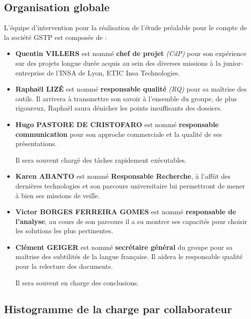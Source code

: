 \documentclass[twoside]{article}
\begin{document}
\subsection{Organisation globale}

L'équipe d'intervention pour la réalisation de l'étude préalable pour le compte
de la société GSTP est composée de : 

\begin{itemize}
\item {\bf Quentin VILLERS} est nommé {\bf chef de projet} {\sl (CdP)} 
pour son expérience sur des projets longue durée acquis au sein des
diverses missions à la junior-entreprise de l'INSA de Lyon, ETIC Insa 
Technologies.
\item {\bf Raphaël LIZÉ} est nommé {\bf responsable qualité} {\sl (RQ)}
pour sa maîtrise des outils. Il arrivera à transmettre son savoir à
l'ensemble du groupe, de plus rigoureux, Raphaël saura dénicher les
points insuffisants des dossiers. 
\item {\bf Hugo PASTORE DE CRISTOFARO} est nommé {\bf responsable communication}
pour son approche commerciale et la qualité de ses présentations. 

Il sera souvent chargé des tâches rapidement exécutables.
\item {\bf Karen ABANTO} est nommé {\bf Responsable Recherche}, à l'affût
des dernières technologies et son parcours universitaire lui permettront
de mener à bien ses missions de veille.
\item {\bf Victor BORGES FERREIRA GOMES} est nommé {\bf responsable de
l'analyse}, au cours de son parcours il a su montrer ses capacités pour
choisir les solutions les plus pertinentes.
\item {\bf Clément GEIGER} est nommé {\bf secrétaire général} du groupe pour
sa maîtrise des subtilités de la langue française. Il aidera le responsable
qualité pour la relecture des documents.

Il sera souvent en charge des conclusions. 
\end{itemize}

\subsection{Histogramme de la charge par collaborateur}
\end{document}

